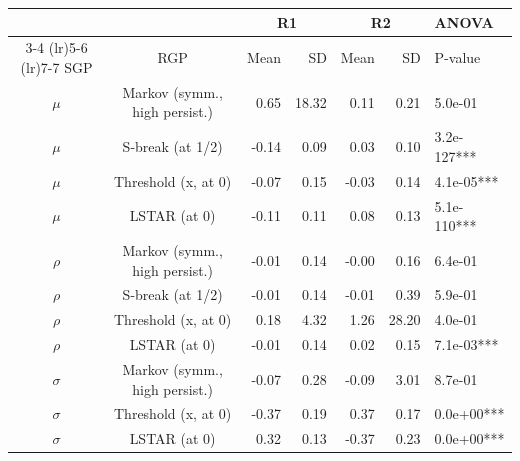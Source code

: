 \begin{table}[t]
\fontsize{8pt}{8pt}\selectfont
\begin{tabular*}{\linewidth}{@{\extracolsep{\fill}}ccrrrrl}
\toprule
 &  & \multicolumn{2}{c}{R1} & \multicolumn{2}{c}{R2} & ANOVA \\ 
\cmidrule(lr){3-4} \cmidrule(lr){5-6} \cmidrule(lr){7-7}
SGP & RGP & Mean & SD & Mean & SD & P-value \\ 
\midrule\addlinespace[2.5pt]
\ensuremath{\mu}   & Markov (symm., high persist.) & 0.65 & 18.32 & 0.11 & 0.21 & 5.0e-01 \\ 
\ensuremath{\mu}   & S-break (at 1/2) & -0.14 & 0.09 & 0.03 & 0.10 & 3.2e-127*** \\ 
\ensuremath{\mu}   & Threshold (x, at 0) & -0.07 & 0.15 & -0.03 & 0.14 & 4.1e-05*** \\ 
\ensuremath{\mu}   & LSTAR (at 0) & -0.11 & 0.11 & 0.08 & 0.13 & 5.1e-110*** \\ 
\ensuremath{\rho}  & Markov (symm., high persist.) & -0.01 & 0.14 & -0.00 & 0.16 & 6.4e-01 \\ 
\ensuremath{\rho}  & S-break (at 1/2) & -0.01 & 0.14 & -0.01 & 0.39 & 5.9e-01 \\ 
\ensuremath{\rho}  & Threshold (x, at 0) & 0.18 & 4.32 & 1.26 & 28.20 & 4.0e-01 \\ 
\ensuremath{\rho}  & LSTAR (at 0) & -0.01 & 0.14 & 0.02 & 0.15 & 7.1e-03*** \\ 
\ensuremath{\sigma} & Markov (symm., high persist.) & -0.07 & 0.28 & -0.09 & 3.01 & 8.7e-01 \\ 
\ensuremath{\sigma} & Threshold (x, at 0) & -0.37 & 0.19 & 0.37 & 0.17 & 0.0e+00*** \\ 
\ensuremath{\sigma} & LSTAR (at 0) & 0.32 & 0.13 & -0.37 & 0.23 & 0.0e+00*** \\ 
\bottomrule
\end{tabular*}
\end{table}
